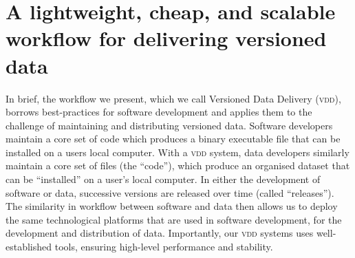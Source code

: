 \documentclass[a4paper,11pt]{article}
\begin{document}



\section{A lightweight, cheap, and scalable workflow for delivering versioned data}


In brief, the workflow we present, which we call Versioned Data Delivery (\textsc{vdd}), borrows best-practices for software development \citep{Perez-Riverol-2016} and applies them to the challenge of maintaining and distributing versioned data. Software developers maintain a core set of code which produces a binary executable file that can be installed on a users local computer. With a \textsc{vdd} system, data developers similarly maintain a core set of files (the ``code''), which produce an organised dataset that can be ``installed'' on a user's local computer. In either the development of software or data, successive versions are released over time (called ``releases''). The similarity in workflow between software and data then allows us to deploy the same technological platforms that are used in software development, for the development and distribution of data. Importantly, our \textsc{vdd} systems uses well-established tools, ensuring high-level performance and stability.
\end{document}
